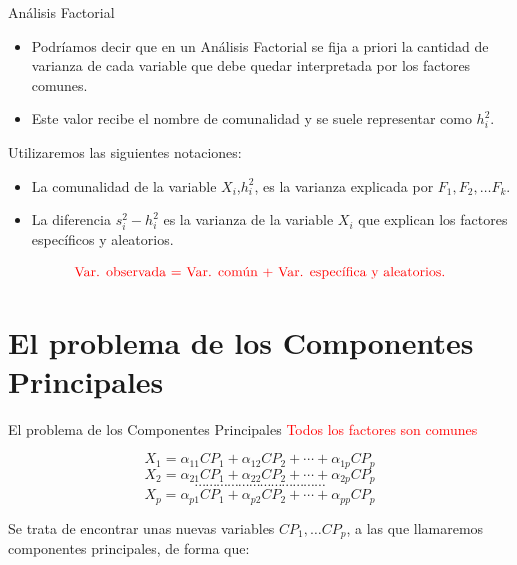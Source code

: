 \documentclass[
  ignorenonframetext,
]{beamer}
\providecommand{\tightlist}{%
  \setlength{\itemsep}{0pt}\setlength{\parskip}{0pt}}
\newcommand\red[1]{\textcolor{red}{#1}}
\begin{document}
\begin{frame}{Análisis Factorial}
\label{anuxe1lisis-factorial-1}
\begin{itemize}
\tightlist
\item
  Podríamos decir que en un Análisis Factorial se fija a priori la
  cantidad de varianza de cada variable que debe quedar interpretada por
  los factores comunes.
\item
  Este valor recibe el nombre de comunalidad y se suele representar como
  \(h_i^2\).
\end{itemize}

Utilizaremos las siguientes notaciones:

\begin{itemize}
\tightlist
\item
  La comunalidad de la variable \(X_i\),\(h_i^2\), es la varianza
  explicada por \(F_1,F_2,\ldots F_k.\)
\item
  La diferencia \(s_i^2-h_i^2\) es la varianza de la variable \(X_i\)
  que explican los factores específicos y aleatorios.
\end{itemize}

\[\color{red}{\mbox{Var. observada = Var. común + Var. específica y aleatorios}}.\]
\end{frame}

\section{El problema de los Componentes
Principales}\label{el-problema-de-los-componentes-principales}

\begin{frame}{El problema de los Componentes Principales}
\label{el-problema-de-los-componentes-principales-1}
\red{Todos los factores son comunes}

\[X_1=\alpha_{1 1} CP_1+ \alpha_{1 2} CP_2+\cdots +\alpha_{1 p} CP_p\]
\[X_2=\alpha_{2 1} CP_1+ \alpha_{2 2} CP_2+\cdots +\alpha_{2 p} CP_p\]
\[\cdots\cdots\cdots\cdots\cdots\cdots\cdots\cdots\cdots\cdots\cdots\cdots\]
\[X_p=\alpha_{p 1} CP_1+ \alpha_{p 2} CP_2+\cdots +\alpha_{p p} CP_p\]

Se trata de encontrar unas nuevas variables \(CP_1,\ldots CP_p\), a las
que llamaremos componentes principales, de forma que:
\end{frame}
\end{document}
